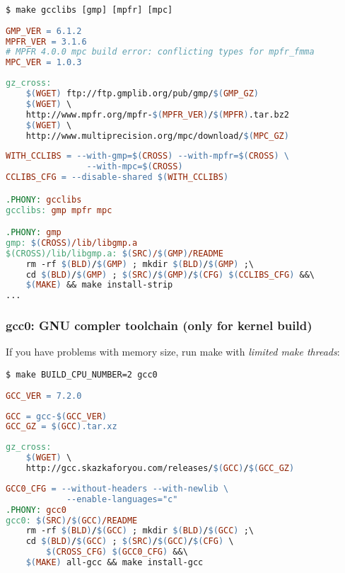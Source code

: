\begin{lstlisting}
$ make gcclibs [gmp] [mpfr] [mpc]
\end{lstlisting}
\begin{lstlisting}[language=make,title=mk/version]
GMP_VER = 6.1.2
MPFR_VER = 3.1.6
# MPFR 4.0.0 mpc build error: conflicting types for mpfr_fmma  
MPC_VER = 1.0.3
\end{lstlisting}
\begin{lstlisting}[language=make,title=mk/gz]
gz_cross:
	$(WGET) ftp://ftp.gmplib.org/pub/gmp/$(GMP_GZ)
	$(WGET) \
	http://www.mpfr.org/mpfr-$(MPFR_VER)/$(MPFR).tar.bz2
	$(WGET) \
	http://www.multiprecision.org/mpc/download/$(MPC_GZ)
\end{lstlisting}
\begin{lstlisting}[language=make,title=mk/cross]
WITH_CCLIBS = --with-gmp=$(CROSS) --with-mpfr=$(CROSS) \
				--with-mpc=$(CROSS)  
CCLIBS_CFG = --disable-shared $(WITH_CCLIBS)

.PHONY: gcclibs
gcclibs: gmp mpfr mpc

.PHONY: gmp
gmp: $(CROSS)/lib/libgmp.a
$(CROSS)/lib/libgmp.a: $(SRC)/$(GMP)/README
	rm -rf $(BLD)/$(GMP) ; mkdir $(BLD)/$(GMP) ;\
	cd $(BLD)/$(GMP) ; $(SRC)/$(GMP)/$(CFG) $(CCLIBS_CFG) &&\
	$(MAKE) && make install-strip
...	
\end{lstlisting}

\clearpage
\subsubsection{gcc0: GNU compler toolchain (only for kernel build)}

If you have problems with memory size, run make with \emph{limited make
threads}:
\begin{lstlisting}
$ make BUILD_CPU_NUMBER=2 gcc0
\end{lstlisting}
\begin{lstlisting}[language=make,title=mk/version]
GCC_VER = 7.2.0
\end{lstlisting}
\begin{lstlisting}[language=make,title=mk/package]
GCC = gcc-$(GCC_VER)
GCC_GZ = $(GCC).tar.xz
\end{lstlisting}
\begin{lstlisting}[language=make,title=mk/gz]
gz_cross:
	$(WGET) \
	http://gcc.skazkaforyou.com/releases/$(GCC)/$(GCC_GZ)
\end{lstlisting}
\begin{lstlisting}[language=make,title=mk/cross]
GCC0_CFG = --without-headers --with-newlib \
			--enable-languages="c"
.PHONY: gcc0
gcc0: $(SRC)/$(GCC)/README
	rm -rf $(BLD)/$(GCC) ; mkdir $(BLD)/$(GCC) ;\
	cd $(BLD)/$(GCC) ; $(SRC)/$(GCC)/$(CFG) \
		$(CROSS_CFG) $(GCC0_CFG) &&\
	$(MAKE) all-gcc && make install-gcc
\end{lstlisting}

